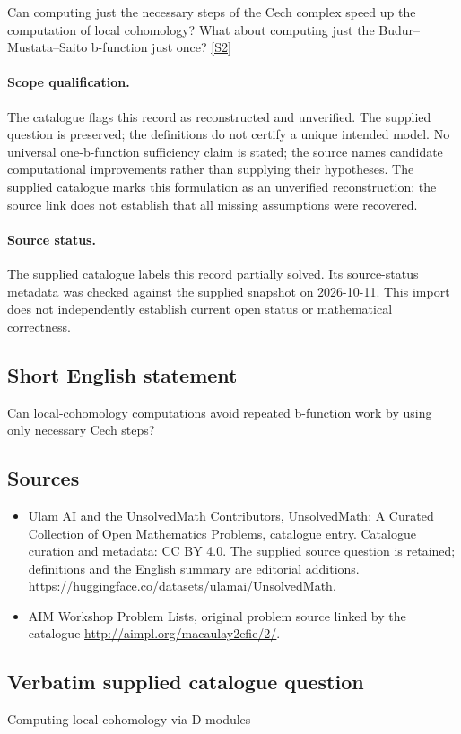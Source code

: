 \documentclass[11pt]{article}
\begin{document}
Can computing just the necessary steps of the Cech complex speed up the computation of local cohomology? What about computing just the Budur--Mustata--Saito b-function just once? \href{http://aimpl.org/macaulay2efie/2/}{[S2]}
\paragraph{Scope qualification.}
The catalogue flags this record as reconstructed and unverified. The supplied question is preserved; the definitions do not certify a unique intended model. No universal one-b-function sufficiency claim is stated; the source names candidate computational improvements rather than supplying their hypotheses.
The supplied catalogue marks this formulation as an unverified reconstruction; the source link does not establish that all missing assumptions were recovered.
\paragraph{Source status.}
The supplied catalogue labels this record partially solved. Its source-status metadata was checked against the supplied snapshot on 2026-10-11. This import does not independently establish current open status or mathematical correctness.
\subsection{Short English statement}
Can local-cohomology computations avoid repeated b-function work by using only necessary Cech steps?
\subsection{Sources}
\begin{itemize}
\item[S1] Ulam AI and the UnsolvedMath Contributors, UnsolvedMath: A Curated Collection of Open Mathematics Problems, catalogue entry. Catalogue curation and metadata: CC BY 4.0. The supplied source question is retained; definitions and the English summary are editorial additions.
\url{https://huggingface.co/datasets/ulamai/UnsolvedMath}.
\item[S2] AIM Workshop Problem Lists, original problem source linked by the catalogue
\url{http://aimpl.org/macaulay2efie/2/}.
\end{itemize}
\subsection{Verbatim supplied catalogue question}
Computing local cohomology via D-modules
\end{document}
